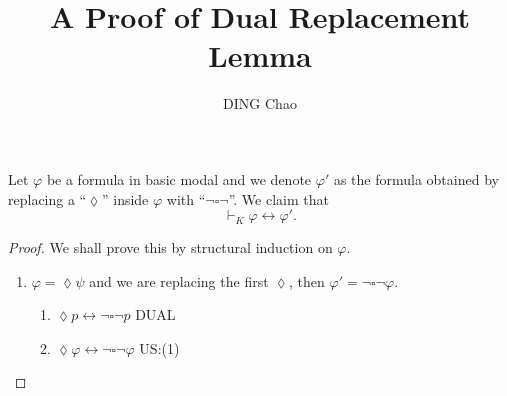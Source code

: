 \documentclass{article}
\begin{document}
\title{A Proof of Dual Replacement Lemma}
\author{DING Chao}
\maketitle

Let $\varphi$ be a formula in basic modal and we denote $\varphi'$ as the formula obtained by replacing a ``$\lozenge$'' inside $\varphi$ with ``$\neg \square \neg$''. We claim that 
	$$\vdash_K \varphi \leftrightarrow \varphi'. $$
\begin{proof}
	
We shall prove this by structural induction on $\varphi$. 
\begin{enumerate}[{Case} 1: ]
	\item $\varphi = \lozenge \psi$ and we are replacing the first $\lozenge$, then $\varphi' = \neg \square \neg \varphi$.
	\begin{enumerate}[(1)]
		\item $\lozenge p \leftrightarrow \neg \square \neg p$ \hfill DUAL
		\item $\lozenge \varphi \leftrightarrow \neg \square \neg \varphi$ \hfill US:(1)
	\end{enumerate} 


\end{enumerate}
\end{proof}
\end{document}
